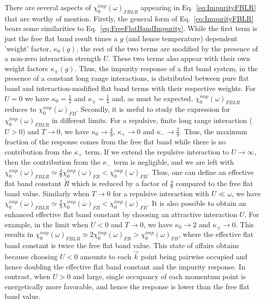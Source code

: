 \documentclass[prl,aps,twocolumn,groupaddress]{revtex4-1}
\begin{document}
There are several aspects of $\chi_0^{imp}(\omega)_{FBLR}$ appearing in Eq.~\ref{eq:ImpurityFBLR} that are worthy of mention. Firstly, the general form of Eq.~\ref{eq:ImpurityFBLR} bears some similarities to Eq.~\ref{eq:FreeFlatBandImpurity}. While the first term is just the free flat band result times a $g$ (and hence temperature) dependent 'weight' factor, $\kappa_0(g)$, the rest of the two terms are modified by the presence of a non-zero interaction strength $U$. These two terms also appear with their own weight factors $\kappa_{\pm}(g)$. Thus, the impurity response of a flat band system, in the presence of a constant long range interactions, is distributed between pure flat band and interaction-modified flat band terms with their respective weights. For $U=0$ we have $\kappa_0 = \frac{1}{2}$ and $\kappa_{\pm} = \frac{1}{4}$ and, as must be expected, $\chi_0^{imp}(\omega)_{FBLR}$ reduces to $\chi_0^{imp}(\omega)_{FB}$. Secondly, it is useful to study the expression for $\chi_0^{imp}(\omega)_{FBLR}$ in different limits. For a repulsive, finite long range interaction ($U>0$) and $T\rightarrow0$, we have $\kappa_0\rightarrow \frac{4}{9}$, $\kappa_+ \rightarrow 0$ and $\kappa_- \rightarrow \frac{2}{9}$. Thus, the maximum fraction of the response comes from the free flat band while there is no contribution from the $\kappa_+$ term. If we extend the repulsive interaction to $U\rightarrow \infty$, then the contribution from the $\kappa_-$ term is negligible, and we are left with $\chi_0^{imp}(\omega)_{FBLR}\simeq \frac{4}{9}\chi_0^{imp}(\omega)_{FB} < \chi_0^{imp}(\omega)_{FB} $. Thus, one can define an effective flat band constant $\tilde{R}$ which is reduced by a factor of $\frac{4}{9}$ compared to the free flat band value. Similarly when $T\rightarrow0$ for a repulsive interaction with $U\ll\omega$, we have $\chi_0^{imp}(\omega)_{FBLR}\simeq \frac{2}{3}\chi_0^{imp}(\omega)_{FB} < \chi_0^{imp}(\omega)_{FB} $. It is also possible to obtain an enhanced effective flat band constant by choosing an attractive interaction $U$. For example, in the limit when $U<0$ and $T\rightarrow0$, we have $\kappa_0 \rightarrow 2$ and $\kappa_{\pm}\rightarrow0$. This results in $\chi_0^{imp}(\omega)_{FBLR}\simeq 2\chi_0^{imp}(\omega)_{FB} > \chi_0^{imp}(\omega)_{FB}$, where the effective flat band constant is twice the free flat band value. This state of affairs obtains because choosing $U<0$ amounts to each $\vec k$ point being pairwise occupied and hence doubling the effective flat band constant and the impurity response. In contrast, when $U>0$ and large, single occupancy of each momentum point is energetically more favorable, and hence the response is lower than the free flat band value. \\ \newline
\end{document}
